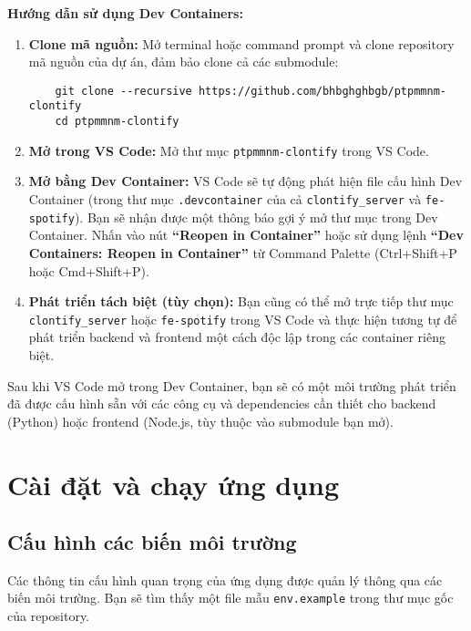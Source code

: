 \textbf{Hướng dẫn sử dụng Dev Containers:}
\begin{enumerate}
    \item \textbf{Clone mã nguồn:} Mở terminal hoặc command prompt và clone repository mã nguồn của dự án, đảm bảo clone cả các submodule:
    \begin{verbatim}
    git clone --recursive https://github.com/bhbghghbgb/ptpmmnm-clontify
    cd ptpmmnm-clontify
    \end{verbatim}
    \item \textbf{Mở trong VS Code:} Mở thư mục \texttt{ptpmmnm-clontify} trong VS Code.
    \item \textbf{Mở bằng Dev Container:} VS Code sẽ tự động phát hiện file cấu hình Dev Container (trong thư mục \texttt{.devcontainer} của cả \texttt{clontify\_server} và \texttt{fe-spotify}). Bạn sẽ nhận được một thông báo gợi ý mở thư mục trong Dev Container. Nhấn vào nút \textbf{``Reopen in Container''} hoặc sử dụng lệnh \textbf{``Dev Containers: Reopen in Container''} từ Command Palette (Ctrl+Shift+P hoặc Cmd+Shift+P).
    \item \textbf{Phát triển tách biệt (tùy chọn):} Bạn cũng có thể mở trực tiếp thư mục \texttt{clontify\_server} hoặc \texttt{fe-spotify} trong VS Code và thực hiện tương tự để phát triển backend và frontend một cách độc lập trong các container riêng biệt.
\end{enumerate}
Sau khi VS Code mở trong Dev Container, bạn sẽ có một môi trường phát triển đã được cấu hình sẵn với các công cụ và dependencies cần thiết cho backend (Python) hoặc frontend (Node.js, tùy thuộc vào submodule bạn mở).

\section{Cài đặt và chạy ứng dụng}
\label{sec:application_setup}

\subsection{Cấu hình các biến môi trường}
\label{subsec:environment_variables}

Các thông tin cấu hình quan trọng của ứng dụng được quản lý thông qua các biến môi trường. Bạn sẽ tìm thấy một file mẫu \texttt{env.example} trong thư mục gốc của repository.

